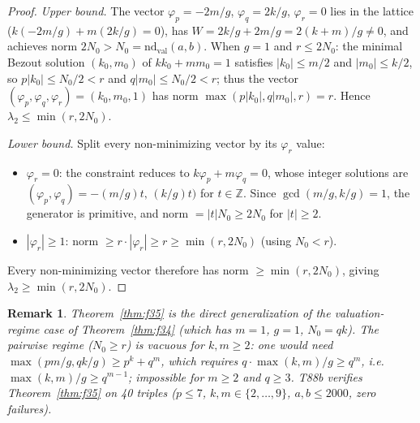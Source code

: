 \documentclass[12pt]{article}
\newtheorem{remark}{Remark}
\theoremstyle{definition}
\begin{document}
\begin{proof}
  \textit{Upper bound.}
  The vector $\varphi_p = -2m/g$, $\varphi_q = 2k/g$, $\varphi_r = 0$ lies in the
  lattice ($k(-2m/g) + m(2k/g) = 0$), has $W = 2k/g + 2m/g = 2(k+m)/g \ne 0$,
  and achieves norm $2N_0 > N_0 = \mathrm{nd}_{\mathrm{val}}(a,b)$.
  When $g = 1$ and $r \le 2N_0$: the minimal Bezout solution $(k_0, m_0)$ of
  $kk_0 + mm_0 = 1$ satisfies $|k_0| \le m/2$ and $|m_0| \le k/2$, so
  $p|k_0| \le N_0/2 < r$ and $q|m_0| \le N_0/2 < r$; thus the vector
  $(\varphi_p, \varphi_q, \varphi_r) = (k_0, m_0, 1)$ has norm
  $\max(p|k_0|, q|m_0|, r) = r$.  Hence $\lambda_2 \le \min(r, 2N_0)$.

  \textit{Lower bound.}
  Split every non-minimizing vector by its $\varphi_r$ value:
  \begin{itemize}
    \item $\varphi_r = 0$: the constraint reduces to $k\varphi_p + m\varphi_q = 0$,
      whose integer solutions are $(\varphi_p, \varphi_q) = -(m/g)t,\,(k/g)t)$
      for $t \in \mathbb{Z}$.  Since $\gcd(m/g, k/g) = 1$, the generator is
      primitive, and norm $= |t|N_0 \ge 2N_0$ for $|t| \ge 2$.
    \item $|\varphi_r| \ge 1$: norm $\ge r \cdot |\varphi_r| \ge r \ge \min(r, 2N_0)$
      (using $N_0 < r$).
  \end{itemize}
  Every non-minimizing vector therefore has norm $\ge \min(r, 2N_0)$,
  giving $\lambda_2 \ge \min(r, 2N_0)$.
\end{proof}

\begin{remark}
  Theorem~\ref{thm:f35} is the direct generalization of the valuation-regime case of
  Theorem~\ref{thm:f34} (which has $m=1$, $g=1$, $N_0 = qk$).
  The pairwise regime ($N_0 \ge r$) is vacuous for $k, m \ge 2$: one would need
  $\max(pm/g, qk/g) \ge p^k + q^m$, which requires $q \cdot \max(k,m)/g \ge q^m$,
  i.e.\ $\max(k,m)/g \ge q^{m-1}$; impossible for $m \ge 2$ and $q \ge 3$.
  T88b verifies Theorem~\ref{thm:f35} on 40 triples
  ($p \le 7$, $k, m \in \{2,\ldots,9\}$, $a, b \le 2000$, zero failures).
\end{remark}
\end{document}
